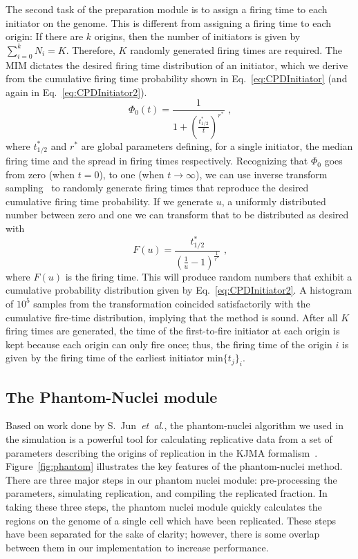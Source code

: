 		The second task of the preparation module is to assign a firing time to each initiator on the genome.
		This is different from assigning a firing time to each origin: If there are $k$ origins, then the number of initiators is given by $\sum\nolimits_{i=0}^k N_i = K$.
		Therefore, $K$ randomly generated firing times are required.
		The MIM dictates the desired firing time distribution of an initiator, which we derive from the cumulative firing time probability shown in Eq.~\ref{eq:CPDInitiator} (and again in Eq.~\ref{eq:CPDInitiator2}).
		\begin{equation} \label{eq:CPDInitiator2}
			\Phi_0(t) = \frac{1}{1+\left(\frac{t^*_{1/2}}{t}\right)^{r^*}}\text{ ,}
		\end{equation}
		where $t^*_{1/2}$ and $r^*$ are global parameters defining, for a single initiator, the median firing time and the spread in firing times respectively. 
		Recognizing that $\Phi_0$ goes from zero (when $t=0$), to one (when $t \rightarrow \infty$), we can use inverse transform sampling~\cite{NumRec} to randomly generate firing times that reproduce the desired cumulative firing time probability.
		If we generate $u$, a uniformly distributed number between zero and one we can transform that to be distributed as desired with
		\begin{equation}
			F(u) = \frac{t^*_{1/2}}{\left(\frac{1}{u}-1\right)^\frac{1}{r^*}} \text{ ,}
		\end{equation}
		where $F(u)$ is the firing time.
		This will produce random numbers that exhibit a cumulative probability distribution given by Eq.~\ref{eq:CPDInitiator2}.
		A histogram of $10^5$ samples from the transformation coincided satisfactorily with the cumulative fire-time distribution, implying that the method is sound.
		After all $K$ firing times are generated, the time of the first-to-fire initiator at each origin is kept because each origin can only fire once; thus, the firing time of the origin $i$ is given by the firing time of the earliest initiator $\text{min}\{t_j\}_i$.
		
		
		\subsection{The Phantom-Nuclei module}
		\label{subsec:PhanNuc}
		
		Based on work done by S.~Jun~\emph{et~al.}, the phantom-nuclei algorithm we used in the simulation is a powerful tool for calculating replicative data from a set of parameters describing the origins of replication in the KJMA formalism~\cite{KJMA1}.
		Figure~\ref{fig:phantom} illustrates the key features of the phantom-nuclei method.
		There are three major steps in our phantom nuclei module: pre-processing the parameters, simulating replication, and compiling the replicated fraction.
		In taking these three steps, the phantom nuclei module quickly calculates the regions on the genome of a single cell which have been replicated.
		These steps have been separated for the sake of clarity; however, there is some overlap between them in our implementation to increase performance.
		
